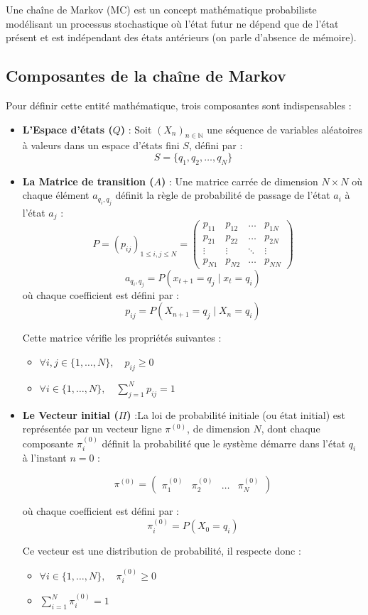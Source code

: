 \documentclass[14pt, a4paper]{extarticle}
\begin{document}
Une chaîne de Markov (MC) est un concept mathématique probabiliste modélisant un processus stochastique où l'état futur ne dépend que de l'état présent et est indépendant des états antérieurs (on parle d'absence de mémoire).

\subsection{Composantes de la chaîne de Markov}
Pour définir cette entité mathématique, trois composantes sont indispensables :
\begin{itemize}
    \item \textbf{L'Espace d'états ($Q$)} : Soit $(X_{n})_{n \in \mathbb{N}}$ une séquence de variables aléatoires à valeurs dans un espace d'états fini $S$, défini par :\[S = \{q_{1}, q_{2}, \dots, q_{N}\}\]
    \item \textbf{La Matrice de transition ($A$)} : Une matrice carrée de dimension $N \times N$ où chaque élément $a_{q_{i},q_{j}}$ définit la règle de probabilité de passage de l'état $a_i$ à l'état $a_j$ :\[
P = (p_{ij})_{1 \le i, j \le N} = 
\begin{pmatrix}
p_{11} & p_{12} & \dots & p_{1N} \\
p_{21} & p_{22} & \dots & p_{2N} \\
\vdots & \vdots & \ddots & \vdots \\
p_{N1} & p_{N2} & \dots & p_{NN}
\end{pmatrix}
\]
    \begin{equation}
        a_{q_{i},q_{j}}=P(x_{t+1}=q_{j} \mid x_{t}=q_{i}) \text{}
    \end{equation}
    où chaque coefficient est défini par :
\[
p_{ij} = P(X_{n+1} = q_j \mid X_n = q_i)
\]

Cette matrice vérifie les propriétés suivantes :
\begin{itemize}
    \item $\forall i, j \in \{1, \dots, N\}, \quad p_{ij} \ge 0$
    \item $\forall i \in \{1, \dots, N\}, \quad \sum_{j=1}^{N} p_{ij} = 1$
\end{itemize}
    \item \textbf{Le Vecteur initial ($\Pi$)} :La loi de probabilité initiale (ou état initial) est représentée par un vecteur ligne $\pi^{(0)}$, de dimension $N$, dont chaque composante $\pi_{i}^{(0)}$ définit la probabilité que le système démarre dans l'état $q_i$ à l'instant $n=0$ :

\[
\pi^{(0)} = \begin{pmatrix} \pi_{1}^{(0)} & \pi_{2}^{(0)} & \dots & \pi_{N}^{(0)} \end{pmatrix}
\]

où chaque coefficient est défini par :
\[
\pi_{i}^{(0)} = P(X_0 = q_i)
\]

Ce vecteur est une distribution de probabilité, il respecte donc :
\begin{itemize}
    \item $\forall i \in \{1, \dots, N\}, \quad \pi_{i}^{(0)} \ge 0$
    \item $\sum_{i=1}^{N} \pi_{i}^{(0)} = 1$
\end{itemize}
\end{itemize}
\end{document}
